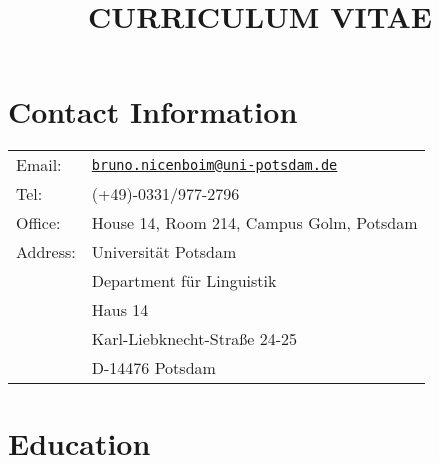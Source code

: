 \documentclass[]{article}
\title{CURRICULUM VITAE}
\author{}
\date{\vspace{-2.5em}}
\begin{document}
\maketitle

\hypertarget{contact-information}{%
\section{Contact Information}\label{contact-information}}

\begin{longtable}[]{@{}ll@{}}
\toprule
\endhead
Email: &
\href{mailto:bruno.nicenboim@uni-potsdam.de}{\nolinkurl{bruno.nicenboim@uni-potsdam.de}}\tabularnewline
Tel: & (+49)-0331/977-2796\tabularnewline
Office: & House 14, Room 214, Campus Golm, Potsdam\tabularnewline
Address: & Universität Potsdam\tabularnewline
& Department für Linguistik\tabularnewline
& Haus 14\tabularnewline
& Karl-Liebknecht-Straße 24-25\tabularnewline
& D-14476 Potsdam\tabularnewline
\bottomrule
\end{longtable}

\hypertarget{education}{%
\section{Education}\label{education}}
\end{document}
